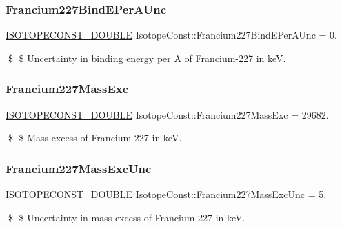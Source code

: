 \subsubsection{\texorpdfstring{Francium227\+Bind\+E\+Per\+A\+Unc}{Francium227BindEPerAUnc}}
{\footnotesize\ttfamily \mbox{\hyperlink{group___isotope_const-_macros_ga8f45a7272ce02c0b4c65c44636ed719a}{I\+S\+O\+T\+O\+P\+E\+C\+O\+N\+S\+T\+\_\+\+D\+O\+U\+B\+LE}} Isotope\+Const\+::\+Francium227\+Bind\+E\+Per\+A\+Unc = 0.}

\$ \$ Uncertainty in binding energy per A of Francium-\/227 in keV. \mbox{\label{group___isotope_const-_francium-_fr227_gabf81347553a1acac31189c4c4e3c09f3}} 
\subsubsection{\texorpdfstring{Francium227\+Mass\+Exc}{Francium227MassExc}}
{\footnotesize\ttfamily \mbox{\hyperlink{group___isotope_const-_macros_ga8f45a7272ce02c0b4c65c44636ed719a}{I\+S\+O\+T\+O\+P\+E\+C\+O\+N\+S\+T\+\_\+\+D\+O\+U\+B\+LE}} Isotope\+Const\+::\+Francium227\+Mass\+Exc = 29682.}

\$ \$ Mass excess of Francium-\/227 in keV. \mbox{\label{group___isotope_const-_francium-_fr227_gabba21a47119a5371a2f5b4b279d7835c}} 
\subsubsection{\texorpdfstring{Francium227\+Mass\+Exc\+Unc}{Francium227MassExcUnc}}
{\footnotesize\ttfamily \mbox{\hyperlink{group___isotope_const-_macros_ga8f45a7272ce02c0b4c65c44636ed719a}{I\+S\+O\+T\+O\+P\+E\+C\+O\+N\+S\+T\+\_\+\+D\+O\+U\+B\+LE}} Isotope\+Const\+::\+Francium227\+Mass\+Exc\+Unc = 5.}

\$ \$ Uncertainty in mass excess of Francium-\/227 in keV. \mbox{\label{group___isotope_const-_francium-_fr227_ga08d38566603242d7dd94626515a2691e}} 
